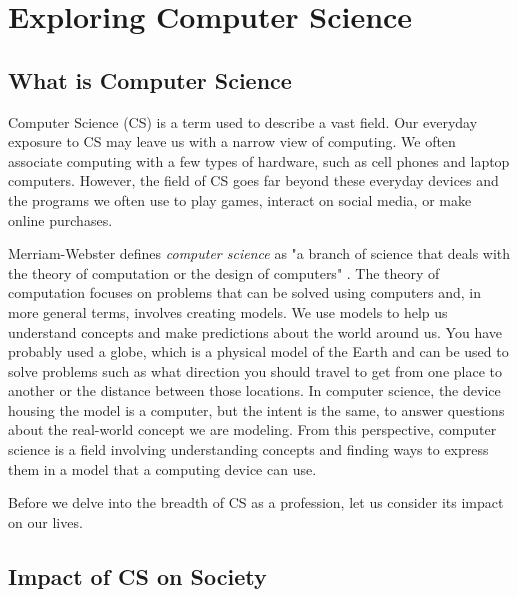 
\newcommand\Tstrut{\rule{0pt}{15pt}}  %

\chapter{Exploring Computer Science}

\section{What is Computer Science}

Computer Science (CS) is a term used to describe a vast field. Our everyday exposure to CS may leave us with a narrow view of computing. We often associate computing with a few types of hardware, such as cell phones and laptop computers. However, the field of CS goes far beyond these everyday devices and the programs we often use to play games, interact on social media, or make online purchases.

Merriam-Webster defines \emph{computer science} as "a branch of science that deals with the theory of computation or the design of computers" \parencite{noauthor_computer_nodate}. The theory of computation focuses on problems that can be solved using computers and, in more general terms, involves creating models. We use models to help us understand concepts and make predictions about the world around us. You have probably used a globe, which is a physical model of the Earth and can be used to solve problems such as what direction you should travel to get from one place to another or the distance between those locations. In computer science, the device housing the model is a computer, but the intent is the same, to answer questions about the real-world concept we are modeling. From this perspective, computer science is a field involving understanding concepts and finding ways to express them in a model that a computing device can use.

Before we delve into the breadth of CS as a profession, let us consider its impact on our lives.


\section{Impact of CS on Society}


